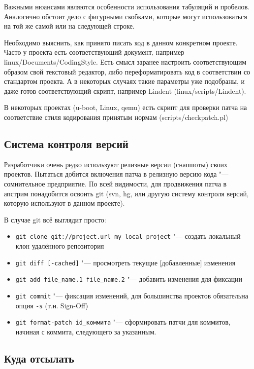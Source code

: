 \documentclass[10pt, a5paper]{article}
\begin{document}
Важными нюансами являются особенности использования табуляций и пробелов. Аналогично обстоит дело с фигурными скобками, которые могут использоваться на той же самой или на следующей строке.

Необходимо выяснить, как принято писать код в данном конкретном проекте. Часто у проекта есть соответствующий документ, например linux/Documents/CodingStyle. Есть смысл заранее настроить соответствующим образом свой текстовый редактор, либо переформатировать код в соответствии со стандартом проекта. А в некоторых случаях такие параметры уже подобраны, и даже готов соответствующий скрипт, например Lindent (linux/scripts/Lindent).

В некоторых проектах (u-boot, Linux, qemu) есть скрипт для проверки патча на соответствие стиля кодирования принятым нормам (scripts/checkpatch.pl)

\subsection*{Система контроля версий}

Разработчики очень редко используют релизные версии (снапшоты) своих проектов. Пытаться добится включения патча в релизную версию кода "--- сомнительное предприятие. По всей видимости, для продвижения патча в апстрим понадобится освоить git (svn, hg, или другую систему контроля версий, которую используют в данном проекте).

В случае git всё выглядит просто:

\begin{itemize}
  \item  \verb!git clone git://project.url my_local_project! "--- создать \linebreak локальный клон удалённого репозитория
  \item  \verb!git diff [-cached]! "--- просмотреть текущие [добавленные] изменения
  \item  \verb!git add file_name.1 file_name.2! "--- добавить изменения для фиксации
  \item  \verb!git commit! "--- фиксация изменений, для большинства проектов обязательна опция \verb!-s! (т.н. Sign-Off)
  \item  \verb!git format-patch id_коммита! "--- сформировать патчи для коммитов, начиная с коммита, следующего за указанным.
\end{itemize}

\subsection*{Куда отсылать}
\end{document}

